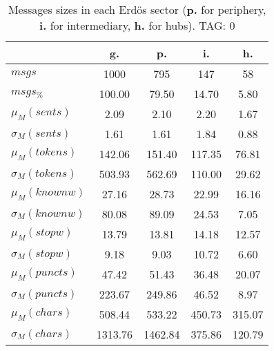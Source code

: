 \begin{table}[h!]
\begin{center}
\begin{tabular}{| l || c | c | c | c |}\hline
 & {\bf g.} & {\bf p.} & {\bf i.} & {\bf h.} \\\hline\hline
$msgs$ & 1000  & 795  & 147  & 58 \\
$msgs_{\%}$ & 100.00  & 79.50  & 14.70  & 5.80 \\\hline
$\mu_M(sents)$ & 2.09  & 2.10  & 2.20  & 1.67 \\
$\sigma_M(sents)$ & 1.61  & 1.61  & 1.84  & 0.88 \\\hline
$\mu_M(tokens)$ & 142.06  & 151.40  & 117.35  & 76.81 \\
$\sigma_M(tokens)$ & 503.93  & 562.69  & 110.00  & 29.62 \\\hline
$\mu_M(knownw)$ & 27.16  & 28.73  & 22.99  & 16.16 \\
$\sigma_M(knownw)$ & 80.08  & 89.09  & 24.53  & 7.05 \\\hline
$\mu_M(stopw)$ & 13.79  & 13.81  & 14.18  & 12.57 \\
$\sigma_M(stopw)$ & 9.18  & 9.03  & 10.72  & 6.60 \\\hline
$\mu_M(puncts)$ & 47.42  & 51.43  & 36.48  & 20.07 \\
$\sigma_M(puncts)$ & 223.67  & 249.86  & 46.52  & 8.97 \\\hline
$\mu_M(chars)$ & 508.44  & 533.22  & 450.73  & 315.07 \\
$\sigma_M(chars)$ & 1313.76  & 1462.84  & 375.86  & 120.79 \\\hline
\end{tabular}
\caption{Messages sizes in each Erd\"os sector ({{\bf p.}} for periphery, {{\bf i.}} for intermediary, {{\bf h.}} for hubs). TAG: 0}
\end{center}
\end{table}